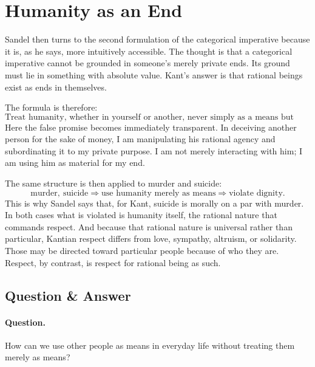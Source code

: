 \section{Humanity as an End}

Sandel then turns to the second formulation of the categorical imperative because it is, as he says, more intuitively accessible. The thought is that a categorical imperative cannot be grounded in someone's merely private ends. Its ground must lie in something with absolute value. Kant's answer is that rational beings exist as ends in themselves.

The formula is therefore:
\begin{equation}
\text{Treat humanity, whether in yourself or another, never simply as a means but always at the same time as an end.}
\end{equation}
Here the false promise becomes immediately transparent. In deceiving another person for the sake of money, I am manipulating his rational agency and subordinating it to my private purpose. I am not merely interacting with him; I am using him as material for my end.

The same structure is then applied to murder and suicide:
\begin{equation}
\text{murder},\ \text{suicide} \Longrightarrow \text{use humanity merely as means} \Longrightarrow \text{violate dignity}.
\end{equation}
This is why Sandel says that, for Kant, suicide is morally on a par with murder. In both cases what is violated is humanity itself, the rational nature that commands respect. And because that rational nature is universal rather than particular, Kantian respect differs from love, sympathy, altruism, or solidarity. Those may be directed toward particular people because of who they are. Respect, by contrast, is respect for rational being as such.

\subsection{Question \& Answer}

\paragraph{Question.} How can we use other people as means in everyday life without treating them merely as means?

